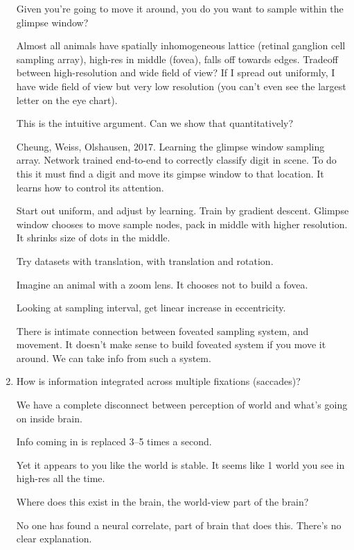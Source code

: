 \begin{enumerate}
Given you're going to move it around, you do you want to sample within the glimpse window? 

Almost all animals have spatially inhomogeneous lattice (retinal ganglion cell sampling array), high-res in middle (fovea), %
falls off towards edges.
Tradeoff between high-resolution and wide field of view? %
If I spread out uniformly, I have wide field of view but very low resolution (you can't even see the largest letter on the eye chart).

This is the intuitive argument. Can we show that quantitatively? 

Cheung, Weiss, Olshausen, 2017.  Learning the glimpse window sampling array. Network trained end-to-end to correctly classify digit in scene. To do this it must find a digit and move its gimpse window to that location. It learns how to control its attention.

Start out uniform, and adjust by learning. Train by gradient descent. Glimpse window chooses to move sample nodes, pack in middle with higher resolution. It shrinks size of dots in the middle.

Try datasets with translation, with translation and rotation.

Imagine an animal with a zoom lens. %
It chooses not to build a fovea.


Looking at sampling interval, get linear increase in eccentricity.

There is intimate connection between foveated sampling system, and movement. It doesn't make sense to build foveated system if you move it around. We can take info from such a system.
\item
How is information integrated across multiple fixations (saccades)?

We have a complete disconnect between perception of world and what's going on inside brain.

Info coming in is replaced 3--5 times a second.

Yet it appears to you like the world is stable. It seems like 1 world you see in high-res all the time.

Where does this exist in the brain, the world-view part of the brain?

No one has found a neural correlate, part of brain that does this. There's no clear explanation. 


\end{enumerate}
